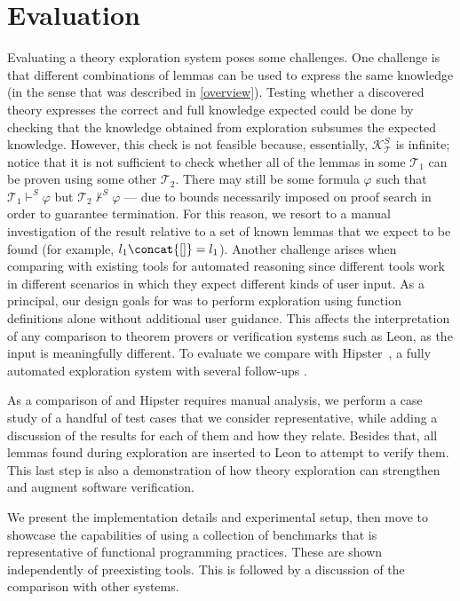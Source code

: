 \section{Evaluation}
\label{results}

Evaluating a theory exploration system poses some challenges.
One challenge is that different combinations of lemmas can be used to express the same knowledge (in the sense that was described in \autoref{overview}).
Testing whether a discovered theory expresses the correct and full knowledge expected could be done by checking that the knowledge obtained from exploration subsumes the expected knowledge. 
However, this check is not feasible because, essentially, $\mathcal{K}_\mathcal{T}^S$ is infinite; notice that it is not sufficient to check whether all of the lemmas in some $\mathcal{T}_1$ can be proven using some other $\mathcal{T}_2$. There may still be some formula $\varphi$ such that $\mathcal{T}_1 \vdash^S \varphi$ but  $\mathcal{T}_2 \not\vdash^S \varphi$ --- due to bounds necessarily imposed on proof search in order to guarantee termination.
For this reason, we resort to a manual investigation of the result relative to a set of known lemmas that we expect to be found (for example, $l_1\concat {[]} = l_1$).
Another challenge arises when comparing with existing tools for automated reasoning since different tools work in different scenarios in which they expect different kinds of user input.
As a principal, our design goals for \TheSy was to perform exploration using function definitions alone without additional user guidance.
This affects the interpretation of any comparison to theorem provers or verification systems such as Leon, as the input is meaningfully different.
To evaluate \TheSy we compare with Hipster~\cite{hipster}, a fully automated exploration system with several follow-ups \cite{hipstercond,ITP2017:Johansson,2018AISC:Einarsdottir}.

As a comparison of \TheSy and Hipster requires manual analysis, we perform a case study of a handful of test cases that we consider representative, while adding a discussion of the results for each of them and how they relate.
Besides that, all lemmas found during exploration are inserted to Leon to attempt to verify them.
This last step is also a demonstration of how theory exploration can strengthen and augment software verification.

We present the implementation details and experimental setup, then move to showcase the capabilities of \TheSy using a collection of benchmarks that is representative of functional programming practices. These are shown independently of preexisting tools.
This is followed by a discussion of the comparison with other systems.

